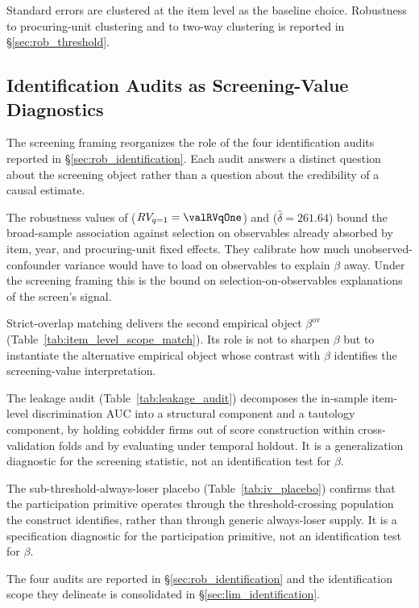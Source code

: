 Standard errors are clustered at the item level as the baseline
choice. Robustness to procuring-unit clustering and to two-way
\citet{cameron2011robust} clustering is reported in
§\ref{sec:rob_threshold}.

\subsection{Identification Audits as Screening-Value Diagnostics}
\label{sec:emp_audits}

The screening framing reorganizes the role of the four
identification audits reported in §\ref{sec:rob_identification}.
Each audit answers a distinct question about the screening
object rather than a question about the credibility of a causal
estimate.

The robustness values of \citet{cinelli2020making}
($RV_{q=1}=\valRVqOne$) and \citet{oster2019unobservable}
($\hat\delta=261.64$) bound the broad-sample association against
selection on observables already absorbed by item, year, and
procuring-unit fixed effects. They calibrate how much
unobserved-confounder variance would have to load on
observables to explain $\beta$ away. Under the screening framing
this is the bound on selection-on-observables explanations of
the screen's signal.

Strict-overlap matching delivers the second empirical object
$\beta^{\text{ov}}$
(Table~\ref{tab:item_level_scope_match}). Its role is not to
sharpen $\beta$ but to instantiate the alternative empirical
object whose contrast with $\beta$ identifies the screening-value
interpretation.

The leakage audit (Table~\ref{tab:leakage_audit}) decomposes the
in-sample item-level discrimination AUC into a structural
component and a tautology component, by holding cobidder firms
out of score construction within cross-validation folds and by
evaluating under temporal holdout. It is a generalization
diagnostic for the screening statistic, not an identification
test for $\beta$.

The sub-threshold-always-loser placebo
(Table~\ref{tab:iv_placebo}) confirms that the participation
primitive operates through the threshold-crossing population the
construct identifies, rather than through generic always-loser
supply. It is a specification diagnostic for the participation
primitive, not an identification test for $\beta$.

The four audits are reported in §\ref{sec:rob_identification}
and the identification scope they delineate is consolidated in
§\ref{sec:lim_identification}.

